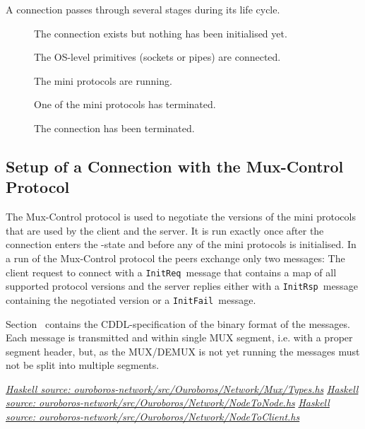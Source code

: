 \documentclass{report}
\newcommand{\hsref}[1]{\href{https://github.com/input-output-hk/ouroboros-network/blob/master/#1}{\emph{Haskell source: #1}}}
\newcommand{\msg}[1]{\texttt{#1}}
\theoremstyle{definition}{
  \newtheorem{lemma}{Lemma}[section] %
  \newtheorem{definition}[lemma]{Definition}
}
\theoremstyle{theorem}{
  \newtheorem{invariant}[lemma]{Invariant}
  \newtheorem{proofobligation}[lemma]{Proof Obligation}
}
\numberwithin{equation}{lemma}
\begin{document}
A connection passes through several stages during its life cycle.
\begin{description}
\item[\Larval]    The connection exists but nothing has been initialised yet.
\item[\Connected] The OS-level primitives (sockets or pipes) are connected.
\item[\Mature] The mini protocols are running.
\item[\Dying]  One of the mini protocols has terminated.
\item[\Dead] The connection has been terminated.
\end{description}

\newcommand{\InitReq}{\msg{InitReq}}
\newcommand{\InitRsp}{\msg{InitRsp}}
\newcommand{\InitFail}{\msg{InitFail}}

\subsection{Setup of a Connection with the Mux-Control Protocol}
The Mux-Control protocol is used to negotiate the versions of the mini
protocols that are used by the client and the server.
It is run exactly once after the connection enters the \Connected-state and before
any of the mini protocols is initialised.
In a run of the Mux-Control protocol the peers exchange only two messages:
The client request to connect with a \InitReq~message that contains a map of all supported protocol versions
and the server replies either with a \InitRsp~message containing the negotiated version
or a \InitFail~message.

Section~\label{included-cddl} contains the CDDL-specification of the binary format of the messages.
Each message is transmitted and within single MUX segment, i.e. with a proper segment header,
but, as the MUX/DEMUX is not yet running the messages must not be split into multiple segments.

\noindent\hsref{ouroboros-network/src/Ouroboros/Network/Mux/Types.hs}
\newline\hsref{ouroboros-network/src/Ouroboros/Network/NodeToNode.hs}
\newline\hsref{ouroboros-network/src/Ouroboros/Network/NodeToClient.hs}
\end{document}
